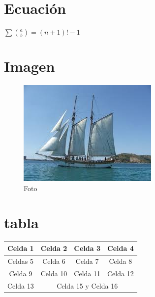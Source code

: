 \documentclass[a4paper,11pt]{article}
\begin{document}
   \part{Ecuación}
  $\sum \binom{a}{b}=(n+1)!-1$
   \part{Imagen}
\begin{figure}[!h]
\includegraphics[scale=.75]{indice.jpg} %
\caption{Foto}%
\label{fig:indice.jpg}
\end{figure}
\part{tabla}
\begin{center}
\begin{tabular}{|c|c|c|c|}
\hline Celda 1 & Celda 2 & Celda 3 & Celda 4 \\
\hline Celdas 5 & Celda 6 & Celda 7 & Celda 8 \\
\hline Celda 9 & Celda 10 & Celda 11 & Celda 12\\
\hline Celda 13 & \multicolumn{3}{|c|}{Celda 15 y Celda 16}\\
\hline
\end{tabular}
\end{center}

\nocite{*}


\end{document}
